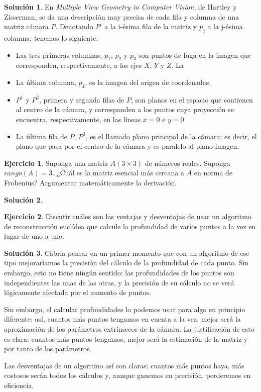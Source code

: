 \documentclass[a4paper, 11pt]{article}
\theoremstyle{definition}
\newtheorem{ejercicio}{Ejercicio}
\newtheorem*{solucion}{Solución}
\theoremstyle{theorem}
\begin{document}
    \begin{solucion}
        En \emph{Multiple View Geometry in Computer Vision}, de Hartley y Zisserman, se da una descripción muy precisa de cada fila y columna de una matriz cámara $P$. Denotando $P^i$ a la i-ésima fila de la matriz y $p_j$ a la j-ésima columna, tenemos lo siguiente:
        \begin{itemize}
            \item Las tres primeras columnas, $p_1$, $p_2$ y $p_3$ son puntos de fuga en la imagen que corresponden, respectivamente, a los ejes $X$, $Y$ y $Z$. La \item La última columna, $p_4$, es la imagen del origen de coordenadas.
            \item $P^1$ y $P^2$, primera y segunda filas de $P$, son planos en el espacio que contienen al centro de la cámara, y corresponden a los puntos cuya proyección se encuentra, respectivamente, en las líneas $x=0$ e $y=0$
            \item La última fila de $P$, $P^3$, es el llamado plano principal de la cámara; es decir, el plano que pasa por el centro de la cámara y es paralelo al plano imagen.
        \end{itemize}
    \end{solucion}

    \begin{ejercicio}
        Suponga una matriz $A(3\times3)$ de números reales. Suponga $rango(A)=3$. ¿Cuál es la matriz esencial más cercana a $A$ en norma de Frobenius? Argumentar matemáticamente la derivación.
    \end{ejercicio}

    \begin{solucion}

    \end{solucion}

    \begin{ejercicio}
        Discutir cuáles son las ventajas y desventajas de usar un algoritmo de reconstrucción euclídea que calcule la profundidad de varios puntos a la vez en lugar de uno a uno.
    \end{ejercicio}

    \begin{solucion}
        Cabría pensar en un primer momento que con un algoritmo de ese tipo mejoraríamos la precisión del cálculo de la profundidad de cada punto. Sin embargo, esto no tiene ningún sentido: las profundidades de los puntos son independientes las unas de las otras, y la precisión de su cálculo no se verá lógicamente afectada por el aumento de puntos.

        Sin embargo, el calcular profundidades lo podemos usar para algo en principio diferente: así, cuantos más puntos tengamos en cuenta a la vez, mejor será la aproximación de los parámetros extrínsecos de la cámara. La justificación de esto es clara: cuantos más puntos tengamos, mejor será la estimación de la matriz y por tanto de los parámetros.

        Las desventajas de un algoritmo así son claras: cuantos más puntos haya, más costosos serán todos los cálculos y, aunque ganemos en precisión, perderemos en eficiencia.
    \end{solucion}
\end{document}
